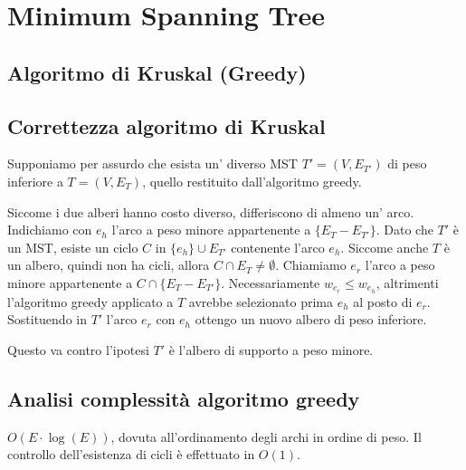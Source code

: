 \documentclass[../template]{subfiles}
\begin{document}
\section{Minimum Spanning Tree}

\begin{center}
\end{center}
\subsection{Algoritmo di Kruskal (Greedy)}

\subsection{Correttezza algoritmo di Kruskal}
Supponiamo per assurdo che esista un' diverso MST $T' = (V,E_{T'})$ di peso inferiore a $T = (V, E_T)$,
quello restituito dall'algoritmo greedy.

Siccome i due alberi hanno costo diverso, differiscono di almeno un' arco.
Indichiamo con $e_h$ l'arco a peso minore appartenente a $\{E_T - E_{T'}\}$.
Dato che $T'$ è un MST, esiste un ciclo $C$ in $\{e_h\} \cup E_{T'}$ contenente l'arco $e_h$.
Siccome anche $T$ è un albero, quindi non ha cicli, allora $C \cap E_{T} \neq \emptyset$.
Chiamiamo $e_r$ l'arco a peso minore appartenente a $C \cap \{E_{T} - E_{T'}\}$.
Necessariamente $w_{e_r} \le w_{e_h}$, altrimenti l'algoritmo greedy applicato a $T$ avrebbe selezionato prima $e_h$ al posto di $e_r$.
Sostituendo in $T'$ l'arco $e_r$ con $e_h$ ottengo un nuovo albero di peso inferiore.

Questo va contro l'ipotesi $T'$ è l'albero di supporto a peso minore.
\subsection{Analisi complessità algoritmo greedy}
$O(E \cdot \log (E))$, dovuta all'ordinamento degli archi in ordine di peso.
Il controllo dell'esistenza di cicli è effettuato in $O(1)$.
\end{document}
